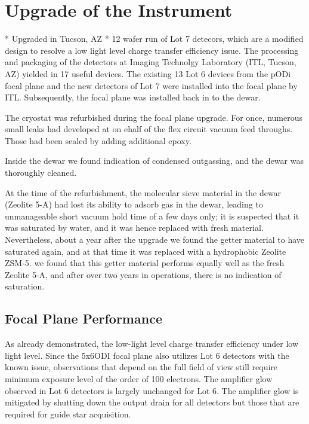 \documentclass[]{spieman}
\begin{document}
\section{Upgrade of the Instrument} * Upgraded in Tucson, AZ * 12 wafer run of
Lot 7 detecors, which are a modified design to resolve a low light level charge
transfer efficiency issue\cite{harbeck2014}. The processing and packaging of the
detectors at Imaging Technolgy Laboratory  (ITL, Tucson, AZ) \cite{lesser2012}
yielded in 17 useful devices. The existing 13 Lot 6 devices from the pODi focal
plane and the new detectors of Lot 7 were installed into the focal plane  by
ITL. Subsequently, the focal plane was installed back in to the dewar.

The cryostat was refurbished during the focal plane upgrade. For once, numerous
small leaks had developed at on ehalf of the flex circuit vacuum feed throughs.
Those had been sealed by adding additional epoxy.

Inside the dewar we found indication of condensed outgassing, and the dewar was
thoroughly cleaned.

At the time of the refurbishment, the molecular sieve material in the dewar
(Zeolite 5-A) had lost its ability to adsorb gas in the dewar, leading to
unmanageable short vacuum hold time of a few days only; it is  suspected that it
was saturated by water, and it was hence replaced with fresh material.
Nevertheless, about a year after the upgrade we found the getter material to
have saturated again, and at that time it was replaced with a hydrophobic
Zeolite ZSM-5. we found that this getter material performs equally well as the
fresh Zeolite 5-A, and after over two years in operations, there is no
indication of saturation.


\subsection{Focal Plane  Performance}

As already demonstrated, the low-light level charge transfer efficiency under
low light level. Since the 5x6ODI focal plane also utilizes  Lot 6 detectors
with the known issue, observations that depend on the full field of view still
require minimum exposure level of the order of 100 electrons. The amplifier glow
observed in Lot 6 detectors is largely unchanged for Lot 6. The amplifier glow
is mitigated by shutting down the output drain for all detectors but those that
are required for guide star acquisition.
\end{document}
